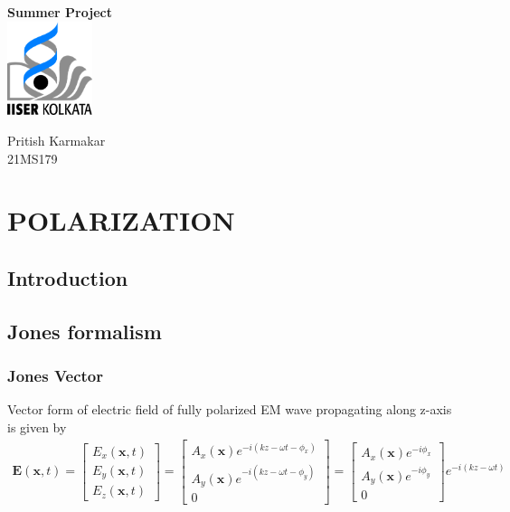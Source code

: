 \documentclass[11pt,a4paper]{article}
\author{Pritish Karmakar}
\begin{document}
	\begin{titlepage}
		\vspace*{3.5cm}
		\centering
		{\Huge\bfseries Summer Project}\\
		\vspace{5cm}
		\includegraphics[width=2.5cm]{iiserk.png}

		\vspace{5cm}
		
		{\LARGE Pritish Karmakar\\}
		\vspace{0.3cm}
		{21MS179}
		\vfill
		
		
		\clearpage
		\tableofcontents
		\clearpage
		\listoftables
		\lstlistoflistings
		
	\end{titlepage}

\section{POLARIZATION}
\subsection{Introduction}

\subsection{Jones formalism}
\subsubsection{Jones Vector}
Vector form of electric field of fully polarized EM wave propagating along z-axis is given by
\begin{align}
	\textbf{E}(\textbf{x},t)=
	\begin{bmatrix}
		E_x(\textbf{x},t)\\
		E_y(\textbf{x},t)\\
		E_z(\textbf{x},t)
	\end{bmatrix} =
\begin{bmatrix}
	A_x(\textbf{x}) e^{-i(kz-\omega t-\phi_x)}\\
	A_y(\textbf{x}) e^{-i(kz-\omega t-\phi_y)}\\
	0
\end{bmatrix}=
\begin{bmatrix}
	A_x(\textbf{x})e^{-i\phi_x}\\
	A_y(\textbf{x})e^{-i\phi_y}\\
	0
\end{bmatrix}e^{-i(kz-\omega t)}
\end{align}
\end{document}
